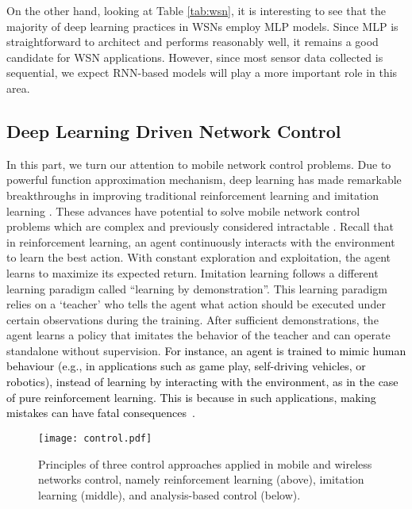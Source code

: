\documentclass[journal,comsoc,letter]{IEEEtran}
\newcommand{\edit}[1]{\textcolor{black}{#1}}
\begin{document}
On the other hand, looking at Table \ref{tab:wsn}, it is interesting to see that the majority of deep learning practices in WSNs employ MLP models. Since MLP is straightforward to architect and performs reasonably well, it remains a good candidate for WSN applications. However, since most sensor data collected is sequential, we expect RNN-based models will play a more important role in this area. 

\subsection{Deep Learning Driven Network Control \label{sec:control}}
In this part, we turn our attention to mobile network control problems. Due to powerful function approximation mechanism, deep learning has made remarkable breakthroughs in improving traditional reinforcement learning \cite{kai2017brief} and imitation learning \cite{ho2016generative}. These advances have potential to solve mobile network control problems which are complex and previously considered intractable \cite{zorzi2016cobanets, roopaei2017deep}. Recall that in reinforcement learning, an agent continuously interacts with the environment to learn the best action. With constant exploration and exploitation, the agent learns to maximize its expected return. Imitation learning follows a different learning paradigm called ``learning by demonstration''. This learning paradigm relies on a `teacher' who tells the agent what action should be executed under certain observations during the training. After sufficient demonstrations, the agent learns a policy that imitates the behavior of the teacher and can operate standalone without supervision. \edit{For instance, an agent is trained to mimic human behaviour (e.g., in applications such as game play, self-driving vehicles, or robotics), instead of learning by interacting with the environment, as in the case of pure reinforcement learning. This is because in such applications, making mistakes can have fatal consequences~\cite{hussein2017imitation}.}

\begin{figure}[t]
\begin{center}
\texttt{[image: control.pdf]}
\end{center}
\caption{\label{fig:control} Principles of three control approaches applied in mobile and wireless networks control, namely reinforcement learning (above), imitation learning (middle), and analysis-based control (below).}
\end{figure}
\end{document}
